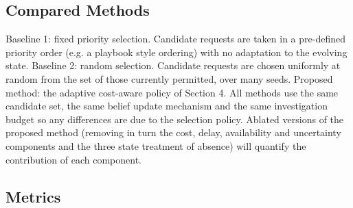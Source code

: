 \documentclass[a4paper,11pt]{article}
\begin{document}
\subsection{Compared Methods}
Baseline 1: fixed priority selection. Candidate requests are taken in a pre-defined priority order (e.g. a playbook style ordering) with no adaptation to the evolving state. Baseline 2: random selection. Candidate requests are chosen uniformly at random from the set of those currently permitted, over many seeds. Proposed method: the adaptive cost-aware policy of Section 4. All methods use the same candidate set, the same belief update mechanism and the same investigation budget so any differences are due to the selection policy. Ablated versions of the proposed method (removing in turn the cost, delay, availability and uncertainty components and the three state treatment of absence) will quantify the contribution of each component.\par
\subsection{Metrics}
\end{document}
